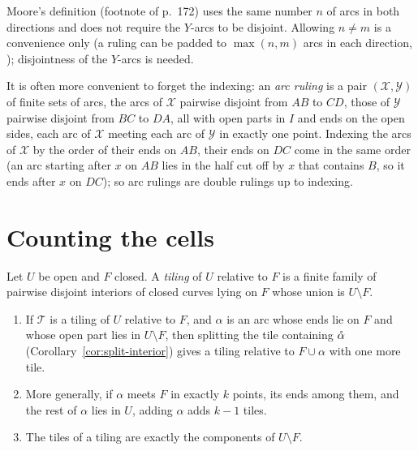 
Moore's definition (footnote of p.~172) uses the same number $n$ of arcs in both directions and does not
require the $Y$-arcs to be disjoint. Allowing $n\ne m$ is a convenience only (a ruling can be padded to
$\max(n,m)$ arcs in each direction, ); disjointness of the $Y$-arcs is needed.

It is often more convenient to forget the indexing: an \emph{arc ruling} is a pair $(\mathcal X,\mathcal Y)$ of finite
sets of arcs, the arcs of $\mathcal X$ pairwise disjoint from $AB$ to $CD$, those of $\mathcal Y$ pairwise disjoint from $BC$
to $DA$, all with open parts in $I$ and ends on the open sides, each arc of $\mathcal X$ meeting each arc of $\mathcal Y$ in
exactly one point. Indexing the arcs of $\mathcal X$ by the order of their ends on $AB$, their ends on $DC$ come in the same
order (an arc starting after $x$ on $AB$ lies in the half cut off by $x$ that contains $B$, so it ends after $x$ on $DC$);
so arc rulings are double rulings up to indexing.


\section{Counting the cells}

\begin{definition}\label{def:tiling}
Let $U$ be open and $F$ closed. A \emph{tiling} of $U$ relative to $F$ is a finite family of pairwise disjoint
interiors of closed curves lying on $F$ whose union is $U\setminus F$.
\end{definition}

\begin{lemma}\label{lem:tiling}
\leavevmode
\begin{enumerate}[label=(\alph*)]
\item If $\mathcal T$ is a tiling of $U$ relative to $F$, and $\alpha$ is an arc whose ends lie on $F$ and whose open
part lies in $U\setminus F$, then splitting the tile containing $\mathring{\alpha}$ (Corollary~\ref{cor:split-interior}) gives a tiling
relative to $F\cup\alpha$ with one more tile.
\item More generally, if $\alpha$ meets $F$ in exactly $k$ points, its ends among them, and the rest of $\alpha$ lies in
$U$, adding $\alpha$ adds $k-1$ tiles.
\item The tiles of a tiling are exactly the components of $U\setminus F$.
\end{enumerate}
\end{lemma}

